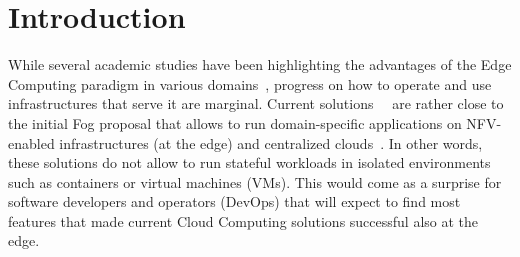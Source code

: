 \section{Introduction}
\label{sec:intro}



While several academic studies have been highlighting the advantages
of the Edge Computing paradigm in various
domains~\cite{bonomi2012fog,satyanarayanan2017emergence,shi2016edge,yi2015fog,zhang2015cloud},
progress on how to operate and use infrastructures that serve it are marginal.
Current solutions~\cite{akamai:cloudlets}~\cite{amazon:lambda-edge} are rather close to the
initial Fog proposal that allows to run domain-specific applications
on  NFV-enabled infrastructures (at the edge) and
centralized clouds~\cite{bonomi2012fog}.  In other words, %
these solutions do not allow to run stateful
workloads in isolated environments such as containers or virtual machines (VMs).
%
This would come as a surprise for software developers and operators (DevOps) that will expect to 
find most features that made current Cloud Computing solutions successful also at the edge.




